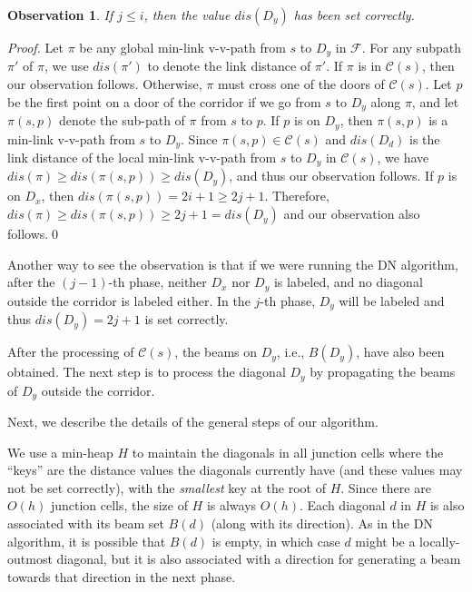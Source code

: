 \documentclass[english,runningheads,11pt]{llncs-revised}
\def\calF{\mathcal{F}}
\def\calC{\mathcal{C}}
\newtheorem{observation}{Observation}
\begin{document}
\begin{observation}\label{obser:10}
If $j\leq i$, then the value $dis(D_y)$ has been set correctly.
\end{observation}
\begin{proof}
Let $\pi$ be any global min-link v-v-path from $s$ to $D_y$ in $\calF$. For any subpath $\pi'$ of $\pi$,
we use $dis(\pi')$ to denote the link distance of $\pi'$.
If $\pi$ is in
$\calC(s)$, then our observation follows. Otherwise, $\pi$ must cross one of
the doors of $\calC(s)$. Let $p$ be the first
point on a door of the corridor if we go from $s$ to $D_y$ along
$\pi$, and let $\pi(s,p)$ denote the sub-path of $\pi$ from $s$ to $p$. If $p$ is on $D_y$, then $\pi(s,p)$ is a min-link v-v-path from $s$
to $D_y$. Since $\pi(s,p)\in \calC(s)$ and $dis(D_d)$ is the link distance of the local
min-link v-v-path from $s$ to $D_y$ in $\calC(s)$, we have $dis(\pi)\geq dis(\pi(s,p))\geq dis(D_y)$, and thus our observation follows. If $p$
is on $D_x$, then $dis(\pi(s,p))=2i+1\geq 2j+1$. Therefore, $dis(\pi)\geq
dis(\pi(s,p))\geq 2j+1=dis(D_y)$ and our observation also follows.\qed
\end{proof}

Another way to see the observation is that if we were running the DN algorithm,
after the $(j-1)$-th phase, neither $D_x$ nor $D_y$ is labeled, and
no diagonal outside the corridor is labeled either. In the $j$-th
phase, $D_y$ will be labeled and thus $dis(D_y)=2j+1$ is set
correctly.


After the processing of $\calC(s)$, the beams on $D_y$, i.e.,
$B(D_y)$, have also been obtained.
The next step is to process the diagonal $D_y$ by propagating the
beams of $D_y$ outside the corridor.



Next, we describe the details of the general steps of our algorithm.

We use a min-heap $H$ to maintain the diagonals in all junction cells where the ``keys'' are the distance values the diagonals currently have (and these values may not be set correctly), with the {\em smallest} key at the root of $H$.  Since there are $O(h)$ junction cells, the size of $H$ is always $O(h)$.
Each diagonal $d$ in $H$ is also associated with its beam set
$B(d)$ (along with its direction).
As in the DN algorithm, it is possible that $B(d)$ is empty,
in which case $d$ might be a locally-outmost
diagonal, but it is also associated with a
direction for generating a beam towards that direction  in the next phase.
\end{document}
